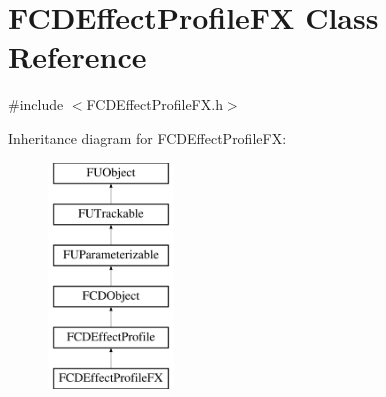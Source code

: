 \hypertarget{classFCDEffectProfileFX}{
\section{FCDEffectProfileFX Class Reference}
\label{classFCDEffectProfileFX}
}


{\ttfamily \#include $<$FCDEffectProfileFX.h$>$}

Inheritance diagram for FCDEffectProfileFX:\begin{figure}[H]
\begin{center}
\leavevmode
\includegraphics[height=6.000000cm]{classFCDEffectProfileFX}
\end{center}
\end{figure}
